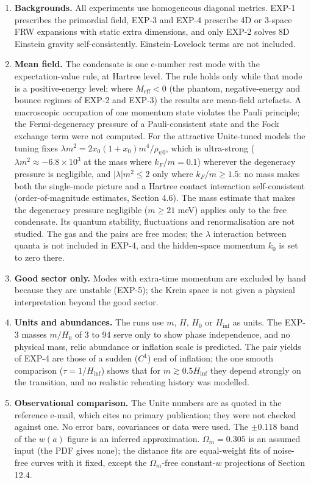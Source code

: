 \documentclass[11pt]{article}
\begin{document}
\begin{enumerate}
\item \textbf{Backgrounds.} All experiments use homogeneous diagonal metrics. EXP-1 prescribes the primordial field, EXP-3 and EXP-4 prescribe 4D or 3-space FRW expansions with static extra dimensions, and only EXP-2 solves 8D Einstein gravity self-consistently. Einstein-Lovelock terms are not included.
\item \textbf{Mean field.} The condensate is one c-number rest mode with the expectation-value rule, at Hartree level. The rule holds only while that mode is a positive-energy level; where $M_{\mathrm{eff}}<0$ (the phantom, negative-energy and bounce regimes of EXP-2 and EXP-3) the results are mean-field artefacts. A macroscopic occupation of one momentum state violates the Pauli principle; the Fermi-degeneracy pressure of a Pauli-consistent state and the Fock exchange term were not computed. For the attractive Unite-tuned models the tuning fixes $\lambda m^2=2x_0(1+x_0)m^4/\rho_{\psi0}$, which is ultra-strong ($\lambda m^2\approx-6.8\times10^{3}$ at the mass where $k_F/m=0.1$) wherever the degeneracy pressure is negligible, and $|\lambda|m^2\le2$ only where $k_F/m\ge1.5$: no mass makes both the single-mode picture and a Hartree contact interaction self-consistent (order-of-magnitude estimates, Section 4.6). The mass estimate that makes the degeneracy pressure negligible ($m\ge21$ meV) applies only to the free condensate. Its quantum stability, fluctuations and renormalisation are not studied. The gas and the pairs are free modes; the $\lambda$ interaction between quanta is not included in EXP-4, and the hidden-space momentum $k_0$ is set to zero there.
\item \textbf{Good sector only.} Modes with extra-time momentum are excluded by hand because they are unstable (EXP-5); the Krein space is not given a physical interpretation beyond the good sector.
\item \textbf{Units and abundances.} The runs use $m$, $H$, $H_0$ or $H_{\mathrm{inf}}$ as units. The EXP-3 masses $m/H_0$ of 3 to 94 serve only to show phase independence, and no physical mass, relic abundance or inflation scale is predicted. The pair yields of EXP-4 are those of a sudden ($C^1$) end of inflation; the one smooth comparison ($\tau=1/H_{\mathrm{inf}}$) shows that for $m\gtrsim0.5H_{\mathrm{inf}}$ they depend strongly on the transition, and no realistic reheating history was modelled.
\item \textbf{Observational comparison.} The Unite numbers are as quoted in the reference e-mail, which cites no primary publication; they were not checked against one. No error bars, covariances or data were used. The $\pm0.118$ band of the $w(a)$ figure is an inferred approximation. $\Omega_m=0.305$ is an assumed input (the PDF gives none); the distance fits are equal-weight fits of noise-free curves with it fixed, except the $\Omega_m$-free constant-$w$ projections of Section 12.4.

\end{enumerate}
\end{document}
